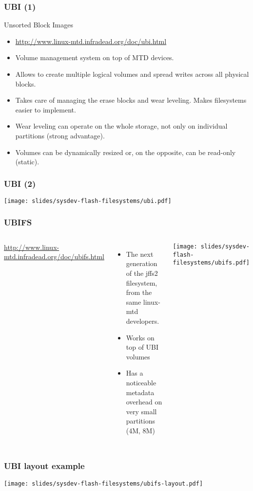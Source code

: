 \begin{frame}
  \frametitle{UBI (1)}
  Unsorted Block Images
  \begin{itemize}
  \item \url{http://www.linux-mtd.infradead.org/doc/ubi.html}
  \item Volume management system on top of MTD devices.
  \item Allows to create multiple logical volumes and spread writes
    across all physical blocks.
  \item Takes care of managing the erase blocks and wear
    leveling. Makes filesystems easier to implement.
  \item Wear leveling can operate on the whole storage,
    not only on individual partitions (strong advantage). 
  \item Volumes can be dynamically resized or, on the opposite, can be
    read-only (static).
  \end{itemize}
\end{frame}

\begin{frame}
  \frametitle{UBI (2)}
  \begin{center}
    \texttt{[image: slides/sysdev-flash-filesystems/ubi.pdf]}
  \end{center}
\end{frame}

\begin{frame}
  \frametitle{UBIFS}
  \begin{columns}
    \url{http://www.linux-mtd.infradead.org/doc/ubifs.html}
    \begin{itemize}
    \item The next generation of the jffs2 filesystem, from the same
      linux-mtd developers.
    \item Works on top of UBI volumes
    \item Has a noticeable metadata overhead on very small partitions
      (4M, 8M)
    \end{itemize}
    \texttt{[image: slides/sysdev-flash-filesystems/ubifs.pdf]}
  \end{columns}
\end{frame}

\begin{frame}
  \frametitle{UBI layout example}
  \begin{center}
    \texttt{[image: slides/sysdev-flash-filesystems/ubifs-layout.pdf]}
  \end{center}
\end{frame}

